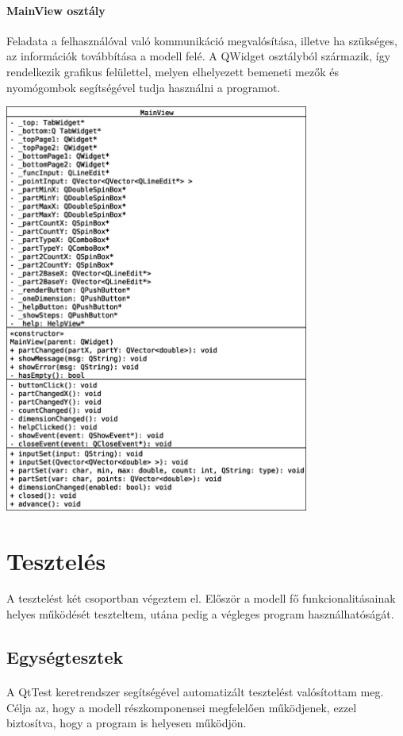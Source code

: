 \documentclass[12pt]{report}
\begin{document}
\paragraph{MainView osztály}
Feladata a felhasználóval való kommunikáció megvalósítása, illetve ha szükséges, az információk továbbítása a modell felé. A QWidget osztályból származik, így rendelkezik grafikus felülettel, melyen elhelyezett bemeneti mezők és nyomógombok segítségével tudja használni a programot.
\begin{center}
\includegraphics[width=10cm]{pics/uml/MainView}
\end{center}

\section{Tesztelés}
A tesztelést két csoportban végeztem el. Először a modell fő funkcionalitásainak helyes működését teszteltem, utána pedig a végleges program használhatóságát.

\subsection{Egységtesztek}
\paragraph{}
A QtTest keretrendszer segítségével automatizált tesztelést valósítottam meg. Célja az, hogy a modell részkomponensei megfelelően működjenek, ezzel biztosítva, hogy a program is helyesen működjön.
\end{document}
